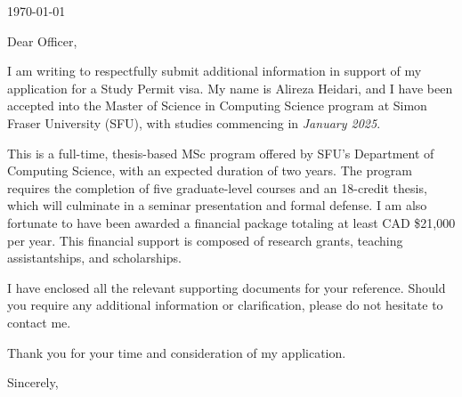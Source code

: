 \thispagestyle{plain}

\noindent
\today


\coverLetterRecipient



Dear Officer,

I am writing to respectfully submit additional information in support of my application for a Study Permit visa. My name is Alireza Heidari, and I have been accepted into the Master of Science in Computing Science program at Simon Fraser University (SFU), with studies commencing in \textit{January 2025}.

This is a full-time, thesis-based MSc program offered by SFU’s Department of Computing Science, with an expected duration of two years. The program requires the completion of five graduate-level courses and an 18-credit thesis, which will culminate in a seminar presentation and formal defense. I am also fortunate to have been awarded a financial package totaling at least CAD \$21,000 per year. This financial support is composed of research grants, teaching assistantships, and scholarships.


I have enclosed all the relevant supporting documents for your reference. Should you require any additional information or clarification, please do not hesitate to contact me.


Thank you for your time and consideration of my application.


\noindent
Sincerely,\\
\applicantName

\clearpage
